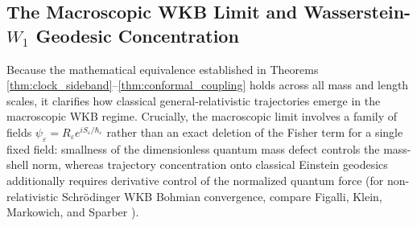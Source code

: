 \documentclass[11pt, a4paper]{article}
\theoremstyle{definition}
\begin{document}
\subsection{\texorpdfstring{The Macroscopic WKB Limit and Wasserstein-$W_1$ Geodesic Concentration}{The Macroscopic WKB Limit and Wasserstein-W1 Geodesic Concentration}}
\label{sec:macroscopic_geodesic_limit}

Because the mathematical equivalence established in Theorems \ref{thm:clock_sideband}--\ref{thm:conformal_coupling} holds across all mass and length scales, it clarifies how classical general-relativistic trajectories emerge in the macroscopic WKB regime. Crucially, the macroscopic limit involves a family of fields $\psi_\varepsilon = R_\varepsilon e^{iS_\varepsilon/\hbar_\varepsilon}$ rather than an exact deletion of the Fisher term for a single fixed field: smallness of the dimensionless quantum mass defect controls the mass-shell norm, whereas trajectory concentration onto classical Einstein geodesics additionally requires derivative control of the normalized quantum force (for non-relativistic Schr\"{o}dinger WKB Bohmian convergence, compare Figalli, Klein, Markowich, and Sparber \cite{Figalli2012}).
\end{document}
